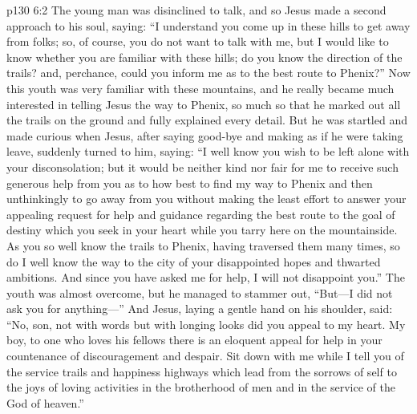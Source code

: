 \vs p130 6:2 The young man was disinclined to talk, and so Jesus made a second approach to his soul, saying: \textcolor{ubdarkred}{“I understand you come up in these hills to get away from folks; so, of course, you do not want to talk with me, but I would like to know whether you are familiar with these hills; do you know the direction of the trails? and, perchance, could you inform me as to the best route to Phenix?”} Now this youth was very familiar with these mountains, and he really became much interested in telling Jesus the way to Phenix, so much so that he marked out all the trails on the ground and fully explained every detail. But he was startled and made curious when Jesus, after saying good\hyp{}bye and making as if he were taking leave, suddenly turned to him, saying: \textcolor{ubdarkred}{“I well know you wish to be left alone with your disconsolation; but it would be neither kind nor fair for me to receive such generous help from you as to how best to find my way to Phenix and then unthinkingly to go away from you without making the least effort to answer your appealing request for help and guidance regarding the best route to the goal of destiny which you seek in your heart while you tarry here on the mountainside. As you so well know the trails to Phenix, having traversed them many times, so do I well know the way to the city of your disappointed hopes and thwarted ambitions. And since you have asked me for help, I will not disappoint you.”} The youth was almost overcome, but he managed to stammer out, “But---I did not ask you for anything---” And Jesus, laying a gentle hand on his shoulder, said: \textcolor{ubdarkred}{“No, son, not with words but with longing looks did you appeal to my heart. My boy, to one who loves his fellows there is an eloquent appeal for help in your countenance of discouragement and despair. Sit down with me while I tell you of the service trails and happiness highways which lead from the sorrows of self to the joys of loving activities in the brotherhood of men and in the service of the God of heaven.”}\plusone
